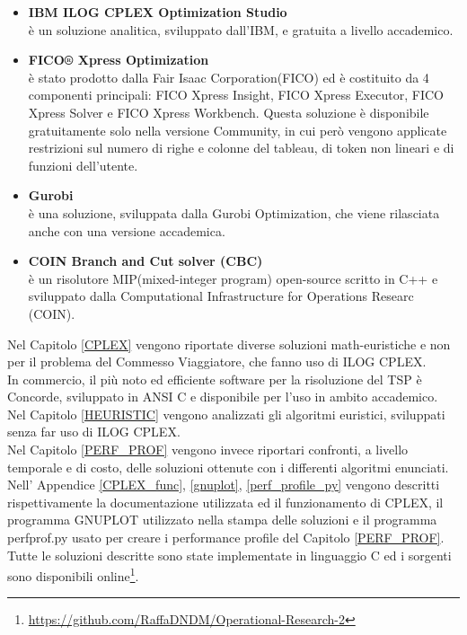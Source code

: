 \begin{itemize}
\item{\textbf{IBM ILOG CPLEX Optimization Studio}\\
è un soluzione analitica, sviluppato dall'IBM, e gratuita a livello accademico.}
\item{\textbf{FICO® Xpress Optimization}\\
è stato prodotto dalla Fair Isaac Corporation(FICO) ed è costituito da 4 componenti principali: FICO Xpress Insight, FICO Xpress Executor, FICO Xpress Solver e FICO Xpress Workbench. Questa soluzione è disponibile gratuitamente solo nella versione Community, in cui però vengono applicate restrizioni sul numero di righe e colonne del tableau, di token non lineari e di funzioni dell'utente.}
\item{\textbf{Gurobi}\\
è una soluzione, sviluppata dalla Gurobi Optimization, che viene rilasciata anche con una versione accademica.}
\item{\textbf{COIN Branch and Cut solver (CBC)}\\
è un risolutore MIP(mixed-integer program) open-source scritto in C++ e sviluppato dalla Computational Infrastructure for Operations Researc (COIN).}
\end{itemize}
Nel Capitolo \ref{CPLEX} vengono riportate diverse soluzioni math-euristiche e non per il problema del Commesso Viaggiatore, che fanno uso di ILOG CPLEX.\\
In commercio, il più noto ed efficiente software per la risoluzione del TSP è Concorde, sviluppato in ANSI C e disponibile per l'uso in ambito accademico\cite{concorde}.\\
Nel Capitolo \ref{HEURISTIC} vengono analizzati gli algoritmi euristici, sviluppati senza far uso di ILOG CPLEX.\\
Nel Capitolo \ref{PERF_PROF} vengono invece riportari confronti, a livello temporale e di costo, delle soluzioni ottenute con i differenti algoritmi enunciati.\\
Nell' Appendice \ref{CPLEX_func}, \ref{gnuplot}, \ref{perf_profile_py} vengono descritti rispettivamente la documentazione utilizzata ed il funzionamento di CPLEX, il programma GNUPLOT utilizzato nella stampa delle soluzioni e il programma perfprof.py usato per creare i performance profile del Capitolo \ref{PERF_PROF}.\\
Tutte le soluzioni descritte sono state implementate in linguaggio C ed i sorgenti sono disponibili online\footnote{\url{https://github.com/RaffaDNDM/Operational-Research-2}}.